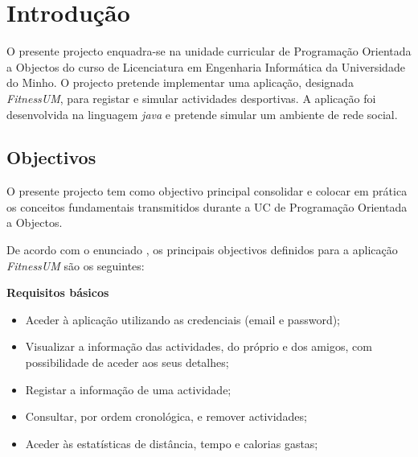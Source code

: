 \documentclass[a4paper,10pt]{report}
\begin{document}

\newpage
\phantom{placeholder} %
\thispagestyle{empty} %
\tableofcontents
\phantom{placeholder} %
\thispagestyle{empty} %
\newpage
\phantom{placeholder} %
\thispagestyle{empty} %
\pagestyle{fancy}
\setlength{\headheight}{15.2pt}
\fancyhf{} %
\fancyfoot[LE,RO]{\thepage}
\setcounter{page}{0}

\chapter{Introdução}
\label{cap:intro}
O presente projecto enquadra-se na unidade curricular de Programação Orientada a Objectos do curso de Licenciatura em Engenharia 
Informática da Universidade do Minho.
O projecto pretende implementar uma aplicação, designada \emph{FitnessUM}, para registar e simular actividades desportivas.
A aplicação foi desenvolvida na linguagem \emph{java} e pretende simular um ambiente de rede social.

\section{Objectivos}
\label{sec:obj}
O presente projecto tem como objectivo principal consolidar e colocar em prática os conceitos fundamentais transmitidos durante a UC de 
Programação Orientada a Objectos.

De acordo com o enunciado \cite{enunciado}, os principais objectivos definidos para a aplicação \emph{FitnessUM} são os seguintes:

\textbf{Requisitos básicos}
\begin{itemize}
\item Aceder à aplicação utilizando as credenciais (email e password);
\item Visualizar a informação das actividades, do próprio e dos amigos, com possibilidade de aceder aos seus detalhes; 
\item Registar a informação de uma actividade;
\item Consultar, por ordem cronológica, e remover actividades;  
\item Aceder às estatísticas de distância, tempo e calorias gastas;
\end{itemize}
\end{document}
